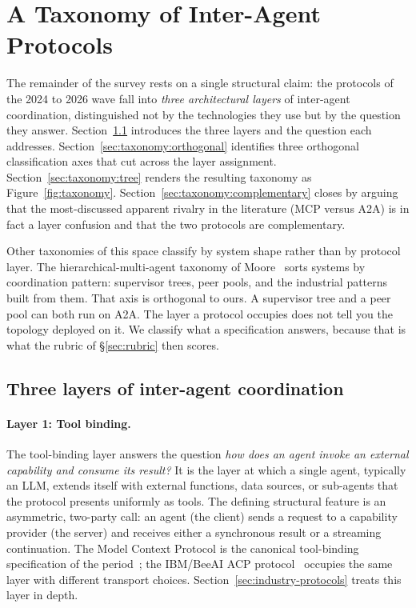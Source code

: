 \section{A Taxonomy of Inter-Agent Protocols}
\label{sec:taxonomy}

The remainder of the survey rests on a single structural claim:
the protocols of the 2024 to 2026 wave fall into \emph{three
architectural layers} of inter-agent coordination, distinguished
not by the technologies they use but by the question they
answer. Section~\ref{sec:taxonomy:layers} introduces the three
layers and the question each addresses. Section~\ref{sec:taxonomy:orthogonal}
identifies three orthogonal classification axes that cut across
the layer assignment. Section~\ref{sec:taxonomy:tree} renders the
resulting taxonomy as Figure~\ref{fig:taxonomy}.
Section~\ref{sec:taxonomy:complementary} closes by arguing that
the most-discussed apparent rivalry in the literature
(MCP versus A2A) is in fact a layer confusion and that the
two protocols are complementary.

Other taxonomies of this space classify by system shape
rather than by protocol layer. The hierarchical-multi-agent
taxonomy of Moore~\cite{hierarchical_taxonomy} sorts systems
by coordination pattern: supervisor trees, peer pools, and
the industrial patterns built from them. That axis is
orthogonal to ours. A supervisor tree and a peer pool can
both run on A2A. The layer a protocol occupies does not tell
you the topology deployed on it. We classify what a
specification answers, because that is what the rubric of
\S\ref{sec:rubric} then scores.

\subsection{Three layers of inter-agent coordination}
\label{sec:taxonomy:layers}

\paragraph{Layer 1: Tool binding.}
The tool-binding layer answers the question \emph{how does
an agent invoke an external capability and consume its
result?} It is the layer at which a single agent, typically
an LLM, extends itself with external functions, data
sources, or sub-agents that the protocol presents
uniformly as tools. The defining structural feature is an
asymmetric, two-party call: an agent (the client) sends a
request to a capability provider (the server) and receives
either a synchronous result or a streaming continuation.
The Model Context Protocol is the canonical tool-binding
specification of the period~\cite{spec_mcp}; the IBM/BeeAI
ACP protocol~\cite{spec_acp} occupies the same layer with
different transport choices. Section~\ref{sec:industry-protocols}
treats this layer in depth.

